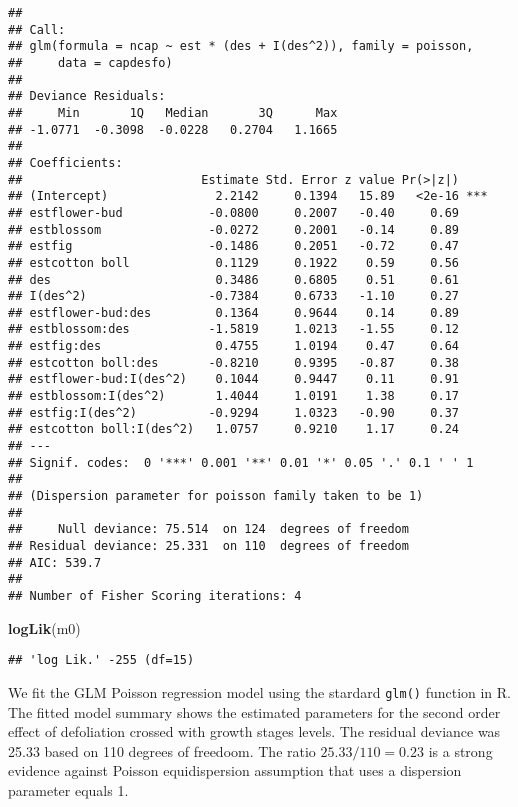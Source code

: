 \documentclass[9pt,a5paper,]{book}
\newenvironment{Shaded}{}{}
\newcommand{\KeywordTok}[1]{\textbf{{#1}}}
\newcommand{\NormalTok}[1]{{#1}}
\renewenvironment{Shaded}{\color{inputcolor}}{}
\theoremstyle{definition}
\theoremstyle{definition}
\theoremstyle{remark}
\begin{document}
\begin{verbatim}
## 
## Call:
## glm(formula = ncap ~ est * (des + I(des^2)), family = poisson, 
##     data = capdesfo)
## 
## Deviance Residuals: 
##     Min       1Q   Median       3Q      Max  
## -1.0771  -0.3098  -0.0228   0.2704   1.1665  
## 
## Coefficients:
##                         Estimate Std. Error z value Pr(>|z|)    
## (Intercept)               2.2142     0.1394   15.89   <2e-16 ***
## estflower-bud            -0.0800     0.2007   -0.40     0.69    
## estblossom               -0.0272     0.2001   -0.14     0.89    
## estfig                   -0.1486     0.2051   -0.72     0.47    
## estcotton boll            0.1129     0.1922    0.59     0.56    
## des                       0.3486     0.6805    0.51     0.61    
## I(des^2)                 -0.7384     0.6733   -1.10     0.27    
## estflower-bud:des         0.1364     0.9644    0.14     0.89    
## estblossom:des           -1.5819     1.0213   -1.55     0.12    
## estfig:des                0.4755     1.0194    0.47     0.64    
## estcotton boll:des       -0.8210     0.9395   -0.87     0.38    
## estflower-bud:I(des^2)    0.1044     0.9447    0.11     0.91    
## estblossom:I(des^2)       1.4044     1.0191    1.38     0.17    
## estfig:I(des^2)          -0.9294     1.0323   -0.90     0.37    
## estcotton boll:I(des^2)   1.0757     0.9210    1.17     0.24    
## ---
## Signif. codes:  0 '***' 0.001 '**' 0.01 '*' 0.05 '.' 0.1 ' ' 1
## 
## (Dispersion parameter for poisson family taken to be 1)
## 
##     Null deviance: 75.514  on 124  degrees of freedom
## Residual deviance: 25.331  on 110  degrees of freedom
## AIC: 539.7
## 
## Number of Fisher Scoring iterations: 4
\end{verbatim}

\begin{Shaded}
\begin{Highlighting}[]
\KeywordTok{logLik}\NormalTok{(m0)}
\end{Highlighting}
\end{Shaded}

\begin{verbatim}
## 'log Lik.' -255 (df=15)
\end{verbatim}

We fit the GLM Poisson regression model using the stardard
\texttt{glm()} function in R. The fitted model summary shows the
estimated parameters for the second order effect of defoliation crossed
with growth stages levels. The residual deviance was 25.33 based on 110
degrees of freedoom. The ratio \(25.33/110 = 0.23\) is a strong evidence
against Poisson equidispersion assumption that uses a dispersion
parameter equals 1.
\end{document}
